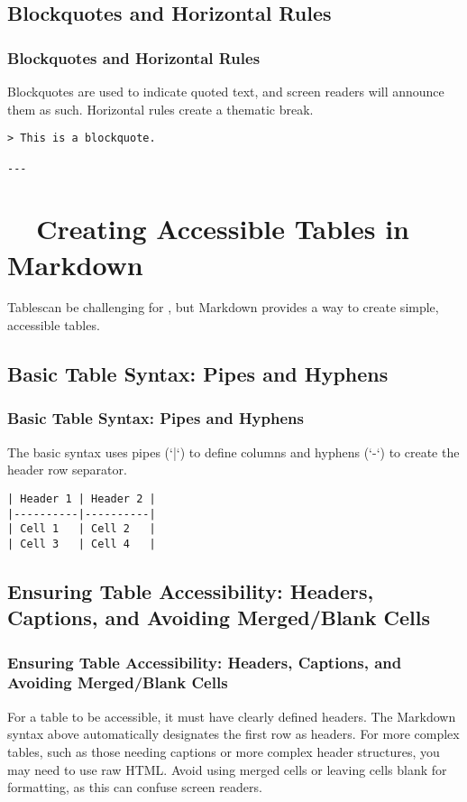 \subsection{Blockquotes and Horizontal Rules}
\label{subsec:markdown-blockquotes-rules}
\subsubsection{Blockquotes and Horizontal Rules}
\label{ssubsec:markdown-blockquotes-rules-details}
Blockquotes are used to indicate quoted text, and screen readers will announce them as such. Horizontal rules create a thematic break.
\begin{verbatim}
> This is a blockquote.

---
\end{verbatim}

\section{~~Creating Accessible Tables in Markdown}
\label{sec:accessible-markdown-tables}
Tablescan be challenging for , but Markdown provides a way to create simple, accessible tables.

\subsection{Basic Table Syntax: Pipes and Hyphens}
\label{subsec:markdown-table-syntax}
\subsubsection{Basic Table Syntax: Pipes and Hyphens}
\label{ssubsec:markdown-table-syntax-details}
The basic syntax uses pipes (`|`) to define columns and hyphens (`-`) to create the header row separator.
\begin{verbatim}
| Header 1 | Header 2 |
|----------|----------|
| Cell 1   | Cell 2   |
| Cell 3   | Cell 4   |
\end{verbatim}

\subsection{Ensuring Table Accessibility: Headers, Captions, and Avoiding Merged/Blank Cells}
\label{subsec:markdown-table-accessibility}
\subsubsection{Ensuring Table Accessibility: Headers, Captions, and Avoiding Merged/Blank Cells}
\label{ssubsec:markdown-table-accessibility-details}
For a table to be accessible, it must have clearly defined headers. The Markdown syntax above automatically designates the first row as headers. For more complex tables, such as those needing captions or more complex header structures, you may need to use raw HTML. Avoid using merged cells or leaving cells blank for formatting, as this can confuse screen readers.

